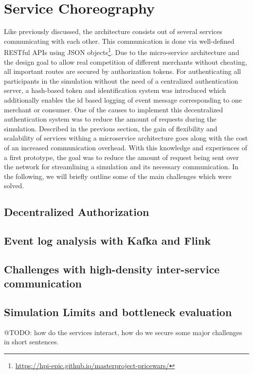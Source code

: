 \section{Service Choreography}
\label{sec:Choreography}
%
Like previously discussed, the architecture consists out of several services communicating with each other. This communication is done via well-defined RESTful APIs using JSON objects\footnote{\url{https://hpi-epic.github.io/masterproject-pricewars/}}.  Due to the micro-service architecture and the design goal to allow real competition of different merchants without cheating, all important routes are secured by authorization tokens. For authenticating all participants in the simulation without the need of a centralized authentication server, a hash-based token and identification system was introduced which additionally enables the id based logging of event message corresponding to one merchant or consumer. One of the causes to implement this decentralized authentication system was to reduce the amount of requests during the simulation. Described in the previous section, the gain of flexibility and scalability of services withing a microservice architecture goes along with the cost of an increased communication overhead. With this knowledge and experiences of a first prototype, the goal was to reduce the amount of request being sent over the network for streamlining a simulation and its necessary communication. 
In the following, we will briefly outline some of the main challenges which were solved.

\subsection{Decentralized Authorization}
\subsection{Event log analysis with Kafka and Flink}
\subsection{Challenges with high-density inter-service communication}
\subsection{Simulation Limits and bottleneck evaluation}

@TODO: how do the services interact, how do we secure some major challenges in short sentences.

